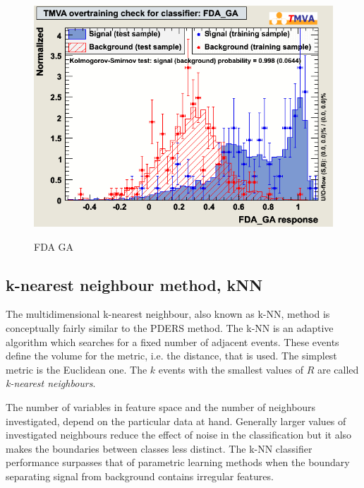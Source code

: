 \begin{figure}[h]
 \begin{minipage}{8.5cm}
\includegraphics[width=1.0\textwidth]{images/pkOvertrain_FDA_GA.png}
\end{minipage}
 \hfill
\begin{minipage}{8.5cm}
FDA GA
\end{minipage}

\label{fig:pkOvertrainFDAGA}
\end{figure}


\subsection{k-nearest neighbour method, kNN}

The multidimensional k-nearest neighbour, also known as k-NN, method
is conceptually fairly similar to the PDERS method. The k-NN is an
adaptive algorithm which searches for a fixed number of adjacent
events. These events define the volume for the metric, i.e. the
distance, that is used. The simplest metric is the Euclidean one. The
$k$ events with the smallest values of $R$ are called
\emph{k-nearest neighbours}.

 The number of variables in feature space and the number of
neighbours investigated, depend on the particular data at
hand. Generally larger values of investigated neighbours reduce the
effect of noise in the classification but it also makes the boundaries
between classes less distinct. The k-NN classifier performance
surpasses that of parametric learning methods when the boundary
separating signal from background contains irregular features.

